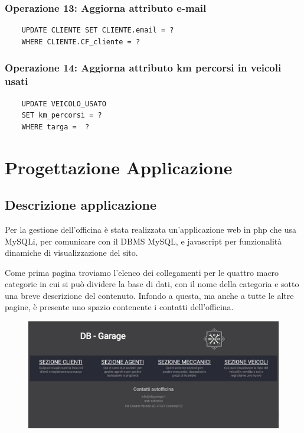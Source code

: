 \documentclass[a4paper,12pt]{report}
\begin{document}
\subsection*{Operazione 13: Aggiorna attributo e-mail}
\begin{lstlisting}
	UPDATE CLIENTE SET CLIENTE.email = ? 
	WHERE CLIENTE.CF_cliente = ?
\end{lstlisting}

\subsection*{Operazione 14: Aggiorna attributo km percorsi in veicoli usati}
\begin{lstlisting}
	UPDATE VEICOLO_USATO
	SET km_percorsi = ?
    WHERE targa =  ?
\end{lstlisting}

\chapter{Progettazione Applicazione}

\section{Descrizione applicazione}
Per la gestione dell'officina è stata realizzata un'applicazione web in php che usa MySQLi, per  
%
comunicare con il DBMS MySQL, e javascript per funzionalità dinamiche di visualizzazione del sito.

Come prima pagina troviamo l'elenco dei collegamenti per le quattro macro categorie in cui si può dividere la base 
%
di dati, con il nome della categoria e sotto una breve descrizione del contenuto. 
%
Infondo a questa, ma anche a tutte le altre pagine, è presente uno spazio contenente i contatti dell'officina.

	\begin{figure}[H]
		\centering
		\includegraphics[scale=0.5]{img/index.jpg}
	\end{figure}
\end{document}
